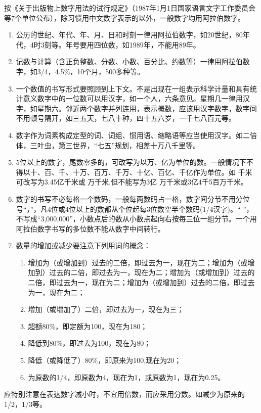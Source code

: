 
按《关于出版物上数字用法的试行规定》（1987年1月1日国家语言文字工作委员会等7个单位公布），除习惯用中文数字表示的以外，一般数字均用阿拉伯数字。
\begin{enumerate}[wide]
	\item 公历的世纪、年代、年、月、日和时刻一律用阿拉伯数字，如20世纪，80年代，4时3刻等。年号要用四位数，如1989年，不能用89年。
	\item 记数与计算（含正负整数、分数、小数、百分比、约数等）一律用阿拉伯数字，如3/4，4.5\%，10个月，500多种等。
	\item 一个数值的书写形式要照顾到上下文。不是出现在一组表示科学计量和具有统计意义数字中的一位数可以用汉字，如一个人，六条意见。星期几一律用汉字，如星期六。邻近两个数字并列连用，表示概数，应该用汉字数字，数字间不用顿号隔开，如三五天，七八十种，四十五六岁，一千七八百元等。
	\item 数字作为词素构成定型的词、词组、惯用语、缩略语等应当使用汉字。如二倍体，三叶虫，第三世界，“七五”规划，相差十万八千里等。
	\item 5位以上的数字，尾数零多的，可改写为以万、亿为单位的数。一般情况下不得以十、百、千、十万、百万、千万、十亿、百亿、千亿作为单位。如 千米可改写为3.45亿千米或 万千米,但不能写为3亿 万千米或3亿4千5百万千米。
	\item 数字的书写不必每格一个数码，一般每两数码占一格，数字间分节不用分位号“，”，凡4位或4位以上的数都从个位起每3位数空半个数码(1/4汉字)。“ ”，不写成“3,000,000”，小数点后的数从小数点起向右按每三位一组分节。一个用阿拉伯数字书写的多位数不能从数字中间转行。
	\item 数量的增加或减少要注意下列用词的概念：
	\begin{enumerate}%
		\item 增加为（或增加到）过去的二倍，即过去为一，现在为二；增加为（或增加到）过去的二倍，即过去为一，现在为二；增加为（或增加到）过去的二倍，即过去为一，现在为二；增加为（或增加到）过去的二倍，即过去为一，现在为二；
		\item 增加（或增加了）二倍，即过去为一，现在为三；
		\item 超额80\%，即定额为100，现在为180；
		\item 降低到80\%，即过去为100，现在为80；
		\item 降低（或降低了）80\%，即原来为100,现在为20；
		\item 为原数的1/4，即原数为4，现在为1，或原数为1，现在为0.25。		
	\end{enumerate}
\end{enumerate}

应特别注意在表达数字减小时，不宜用倍数，而应采用分数。如减少为原来的1/2，1/3等。
